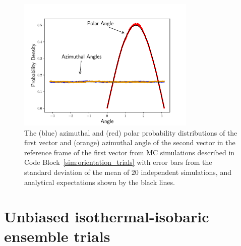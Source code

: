 \documentclass[
  9pt,
  bestpractices,
]{livecoms}
\begin{document}
\begin{figure}
\begin{centering}
\includegraphics[width=8.5cm]{../figures/orientation_trials.pdf}
\caption{
  The (blue) azimuthal and (red) polar probability distributions of the first vector and (orange) azimuthal angle of the second vector in the reference frame of the first vector from MC simulations described in Code Block~\ref{sim:orientation_trials} with error bars from the standard deviation of the mean of $20$ independent simulations, and analytical expectations shown by the black lines.
\label{fig:orientation_trials}
}
\end{centering}
\end{figure}


\section{\label{sec:rhs_npt}Unbiased isothermal-isobaric ensemble trials}
\end{document}
